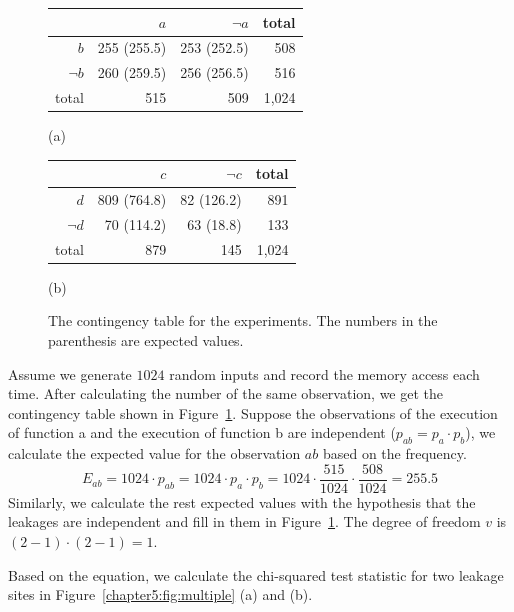 \begin{figure}[h]
  \begin{minipage}{0.46\linewidth}
      \begin{tabular}{rrrr}
        \toprule
        & $a$ & $\lnot a$  & total\\
        \midrule
        $b$   & 255 (255.5) & 253 (252.5) &   508  \\
        $\lnot b$   & 260 (259.5)  & 256 (256.5) &    516   \\
        total &   515 &  509   & 1,024   \\
        \bottomrule
      \end{tabular}\caption*{(a)}
  \end{minipage}
\hfill
  \begin{minipage}{0.46\linewidth}
      \begin{tabular}{rrrr}
        \toprule
        & $c$ & $\lnot c$  & total\\
        \midrule
        $d$   & 809 (764.8) & 82 (126.2) & 891    \\
        $\lnot d$   & 70 (114.2)  & 63 (18.8)&  133     \\
        total &  879 &  145  & 1,024    \\
        \bottomrule
      \end{tabular}\caption*{(b)}
  \end{minipage}
  \caption{The contingency table for the experiments. The numbers in the parenthesis are expected values. }\label{chapter5:fig:con_table}
\end{figure}


Assume we generate $1024$ random inputs and record the memory access each time.  After calculating the number of the same observation, we get the contingency table shown in Figure~\ref{chapter5:fig:con_table}. Suppose the observations of the execution of function \textsf{a} and the execution of function \textsf{b} are independent ($p_{ab} = p_a \cdot p_b$),  we calculate the expected value for the observation $ab$ based on the frequency.
\[ E_{ab} = 1024 \cdot p_{ab} = 1024\cdot p_a \cdot p_b = 1024  \cdot \frac{515}{1024} \cdot \frac{508}{1024} = 255.5\]
Similarly, we calculate the rest expected values with the hypothesis that the leakages are independent and fill in them in Figure~\ref{chapter5:fig:con_table}. The degree of freedom $v$ is $(2-1)\cdot(2-1) = 1$.

Based on the equation, we calculate the chi-squared test statistic for two leakage sites in Figure~\ref{chapter5:fig:multiple} (a) and (b).

